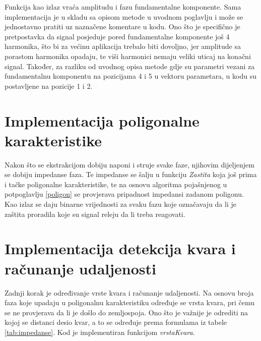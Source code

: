 Funkcija kao izlaz vraća amplitudu i fazu fundamentalne komponente. Sama implementacija je u skladu sa opisom metode u uvodnom poglavlju i može se jednostavno pratiti uz naznačene komentare u kodu. Ono što je specifično je pretpostavka da signal posjeduje pored fundamentalne komponente još 4 harmonika, što bi za većinu aplikacija trebalo biti dovoljno, jer amplitude sa porastom harmonika opadaju, te viši harmonici nemaju veliki uticaj na konačni signal. Također, za razliku od uvodnog opisa metode gdje su parametri vezani za fundamentalnu komponentu na pozicijama 4 i 5 u vektoru parametara, u kodu su postavljene na pozicije 1 i 2.

\section{Implementacija poligonalne karakteristike}

Nakon što se ekstrakcijom dobiju naponi i struje svake faze, njihovim dijeljenjem se dobiju impedanse faza. Te impedanse se šalju u funkciju \textit{Zastita} koja još prima i tačke poligonalne karakteristike, te na osnovu algoritma pojašnjenog u potpoglavlju \ref{poligon} se provjerava pripadnost impedansi zadanom poligonu. Kao izlaz se daju binarne vrijednosti za svaku fazu koje označavaju da li je zaštita proradila koje su signal releju da li treba reagovati. 



\section{Implementacija detekcija kvara i računanje udaljenosti}

Zadnji korak je određivanje vrste kvara i računanje udaljenosti. Na osnovu broja faza koje upadaju u poligonalnu karakteristiku određuje se vrsta kvara, pri čemu se ne provjerava da li je došlo do zemljospoja. Ono što je važnije je odrediti na kojoj se distanci desio kvar, a to se određuje prema formulama iz tabele \ref{tab:impedanse}. Kod je implementiran funkcijom \textit{vrstaKvara}.



